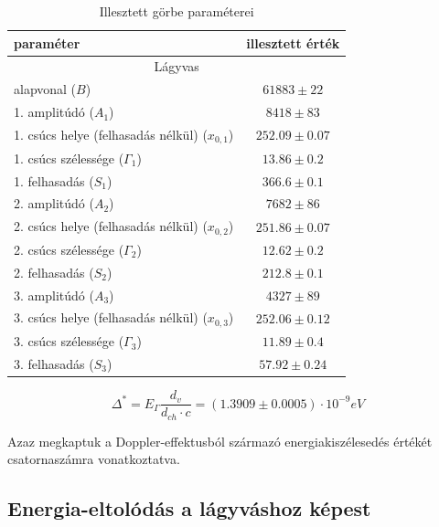 \documentclass[a4paper,12pt]{article}
\begin{document}
\begin{table}[h]
	\begin{center}
	\begin{tabular}{|l|c|}
		\hline
		\textbf{paraméter} & \textbf{illesztett érték} \\
		\hline
		\multicolumn{2}{c}{Lágyvas} \\
		\hline
		alapvonal ($B$) & $61883 \pm 22 $\\
		\hline
		1. amplitúdó ($A_1$) & $8418 \pm 83 $\\
		\hline
		1. csúcs helye (felhasadás nélkül) ($x_{0, 1}$) & $252.09 \pm 0.07$\\
		\hline
		1. csúcs szélessége ($\Gamma_1$) & $13.86 \pm 0.2$\\
		\hline
		1. felhasadás ($S_1$) & $366.6 \pm 0.1$ \\
		\hline
		2. amplitúdó ($A_2$) & $7682 \pm 86 $\\
		\hline
		2. csúcs helye (felhasadás nélkül) ($x_{0, 2}$) & $251.86\pm 0.07$\\
		\hline
		2. csúcs szélessége ($\Gamma_2$) & $12.62 \pm 0.2 $\\
		\hline
		2. felhasadás ($S_2$) & $212.8 \pm 0.1$ \\
		\hline
		3. amplitúdó ($A_3$) & $4327 \pm 89 $\\
		\hline
		3. csúcs helye (felhasadás nélkül) ($x_{0, 3}$) & $252.06 \pm 0.12$\\
		\hline
		3. csúcs szélessége ($\Gamma_3$) & $11.89 \pm 0.4$\\
		\hline
		3. felhasadás ($S_3$) & $57.92 \pm 0.24$ \\
		\hline
	\end{tabular}
	\end{center}
	\caption{Illesztett görbe paraméterei}
	\label{tab:params}
\end{table}


\begin{equation*}
	\Delta^{*} = E_{\Gamma}\frac{d_{v}}{d_{ch}\cdot c} = (1.3909 \pm 0.0005) \cdot 10^{-9} eV
\end{equation*}

\par Azaz megkaptuk a Doppler-effektusból származó energiakiszélesedés értékét csatornaszámra vonatkoztatva.

\subsection{Energia-eltolódás a lágyváshoz képest}
\end{document}

